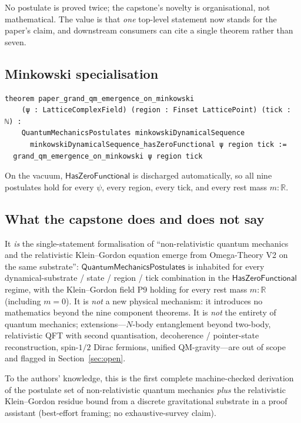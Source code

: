\documentclass[11pt,a4paper,twoside]{article}
\theoremstyle{definition}
\newcommand{\Rbb}{\mathbb{R}}
\newcommand{\HasZF}{\mathsf{HasZeroFunctional}}
\begin{document}
\noindent No postulate is proved twice; the capstone's novelty is
organisational, not mathematical. The value is that \emph{one}
top-level statement now stands for the paper's claim, and downstream
consumers can cite a single theorem rather than seven.

\subsection{Minkowski specialisation}\label{sec:capstone-minkowski}

\begin{lstlisting}
theorem paper_grand_qm_emergence_on_minkowski
    (ψ : LatticeComplexField) (region : Finset LatticePoint) (tick : ℕ) :
    QuantumMechanicsPostulates minkowskiDynamicalSequence
      minkowskiDynamicalSequence_hasZeroFunctional ψ region tick :=
  grand_qm_emergence_on_minkowski ψ region tick
\end{lstlisting}

On the vacuum, $\HasZF$ is discharged automatically, so all nine
postulates hold for every $\psi$, every region, every tick, and every
rest mass $m : \Rbb$.

\subsection{What the capstone does and does not
say}\label{sec:capstone-neg}

It \emph{is} the single-statement formalisation of ``non-relativistic
quantum mechanics and the relativistic Klein--Gordon equation emerge
from Omega-Theory V2 on the same substrate'':
$\mathsf{QuantumMechanicsPostulates}$ is inhabited for every
dynamical-substrate / state / region / tick combination in the
$\HasZF$ regime, with the Klein--Gordon field P9 holding for every
rest mass $m : \Rbb$ (including $m = 0$). It is \emph{not} a new
physical mechanism: it introduces no mathematics beyond the nine
component theorems. It is \emph{not} the entirety of quantum
mechanics; extensions---$N$-body entanglement beyond two-body,
relativistic QFT with second quantisation, decoherence /
pointer-state reconstruction, spin-$1/2$ Dirac fermions, unified
QM-gravity---are out of scope and flagged in Section~\ref{sec:open}.

To the authors' knowledge, this is the first complete machine-checked
derivation of the postulate set of non-relativistic quantum mechanics
\emph{plus} the relativistic Klein--Gordon residue bound from a
discrete gravitational substrate in a proof assistant (best-effort
framing; no exhaustive-survey claim).
\end{document}
